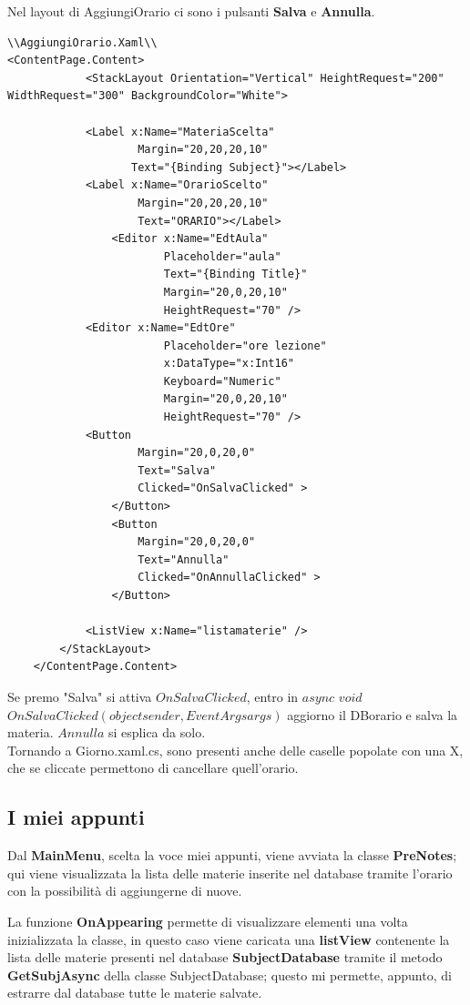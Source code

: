 \documentclass[a4paper, 50pt, twoside]{article}
\begin{document}
Nel layout di AggiungiOrario ci sono i pulsanti \textbf{Salva} e \textbf{Annulla}.
\begin{lstlisting}
\\AggiungiOrario.Xaml\\
<ContentPage.Content>
            <StackLayout Orientation="Vertical" HeightRequest="200" WidthRequest="300" BackgroundColor="White">

            <Label x:Name="MateriaScelta"
                    Margin="20,20,20,10" 
                   Text="{Binding Subject}"></Label>
            <Label x:Name="OrarioScelto"
                    Margin="20,20,20,10" 
                    Text="ORARIO"></Label>
                <Editor x:Name="EdtAula"
                        Placeholder="aula"
                        Text="{Binding Title}"
                        Margin="20,0,20,10"
                        HeightRequest="70" />
            <Editor x:Name="EdtOre"
                        Placeholder="ore lezione"
                        x:DataType="x:Int16"
                        Keyboard="Numeric"
                        Margin="20,0,20,10"
                        HeightRequest="70" />
            <Button 
                    Margin="20,0,20,0" 
                    Text="Salva"
                    Clicked="OnSalvaClicked" >
                </Button>
                <Button 
                    Margin="20,0,20,0" 
                    Text="Annulla"
                    Clicked="OnAnnullaClicked" >                    
                </Button>

            <ListView x:Name="listamaterie" />
        </StackLayout>
    </ContentPage.Content>
\end{lstlisting}
Se premo "Salva" si attiva  $OnSalvaClicked$, entro in $async$ $void$ $OnSalvaClicked(object sender, EventArgs args)$ aggiorno il DBorario e salva la materia.
$Annulla$ si esplica da solo. 
\\
Tornando a Giorno.xaml.cs, sono presenti anche delle caselle popolate con una X, che se cliccate permettono di cancellare quell'orario.
\subsection{I miei appunti}
Dal \textbf{MainMenu}, scelta la voce miei appunti, viene avviata la classe \textbf{PreNotes}; qui viene visualizzata la lista delle materie inserite nel database tramite l'orario con la possibilità di aggiungerne di nuove.

La funzione \textbf{OnAppearing} permette di visualizzare elementi una volta inizializzata la classe, in questo caso viene caricata una \textbf{listView} contenente la lista delle materie presenti nel database \textbf{SubjectDatabase} tramite il metodo \textbf{GetSubjAsync} della classe SubjectDatabase; questo mi permette, appunto, di estrarre dal database tutte le materie salvate.
\end{document}
